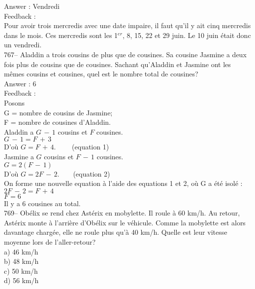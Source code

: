 ﻿\documentclass[letterpaper, 12pt]{article}
\begin{document}
Answer : Vendredi\\

Feedback : \\
Pour avoir trois mercredis avec une date impaire, il faut qu'il y ait cinq
mercredis dans le mois.  Ces mercredis sont les 1$^{er}$, 8, 15, 22 et 29
juin.  Le 10 juin \'etait donc un vendredi.  \\


767-- Aladdin a trois cousins de plus que de cousines.  Sa cousine Jasmine a
deux fois plus de cousins que de cousines.  Sachant qu'Aladdin et Jasmine
ont les m\^emes cousins et cousines, quel est le nombre total de cousines?\\

Answer : 6 \\

Feedback : \\
Posons\\
G = nombre de cousins de Jasmine;\\
F = nombre de cousines d'Aladdin.\\

Aladdin a $G\,-\,1$ cousins et $F$ cousines.\\
$G\,-\,1=F\,+\,3$\\
D'o\`u $G=F\,+\,4. \qquad$ (equation 1)\\

Jasmine a $G$ cousins et $F\,-\,1$ cousines.  \\
$G=2\left( F\,-\,1\right)  $\\
D'o\`u $G=2F\,-\,2. \qquad $(equation 2) \\

On forme une nouvelle equation \`a l'aide des equations 1 et 2, o\`u G a
\'et\'e isol\'e :\\
$2F\,-\,2=F\,+\,4$\\
$F=6$\\
Il y a 6 cousines au total.\\



769-- Ob\'elix se rend chez Ast\'erix en mobylette.  Il roule \`a 60 km/h.
Au retour, Ast\'erix monte \`a l'arri\`ere d'Ob\'elix sur le v\'ehicule.
Comme la mobylette est alors davantage charg\'ee, elle ne roule plus qu'\`a
40 km/h.  Quelle est leur vitesse moyenne lors de l'aller-retour?\\
a) 46 km/h\\
b) 48 km/h\\
c) 50 km/h\\
d) 56 km/h\\
\end{document}
